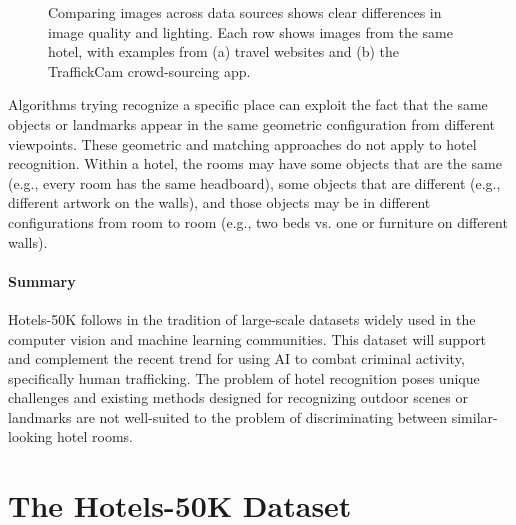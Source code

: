 \begin{figure*}
\begin{tabular}{ccc|ccc}
    \end{tabular}
    \caption[Image variability from different sources]{Comparing images across data sources shows clear differences in image quality and lighting.  Each row shows images from the same hotel, with examples from (a) travel websites and (b) the TraffickCam crowd-sourcing app.}
    \label{fig:domainImages}
\end{figure*}

Algorithms trying recognize a specific place can exploit the fact that the same objects or landmarks appear in the same geometric configuration from different viewpoints. These geometric and matching approaches do not apply to hotel recognition.
Within a hotel, the rooms may have some objects that are the same (e.g., every room has the same headboard), some objects that are different (e.g., different artwork on the walls), and those objects may be in different configurations from room to room (e.g., two beds vs. one or furniture on different walls).

\paragraph{Summary} Hotels-50K follows in the tradition of large-scale datasets widely used in the computer vision and machine learning communities. This dataset will support and complement the recent trend for using AI to combat criminal activity, specifically human trafficking. The problem of hotel recognition poses unique challenges and existing methods designed for recognizing outdoor scenes or landmarks are not well-suited to the problem of discriminating between similar-looking hotel rooms. 

\section{The Hotels-50K Dataset}

